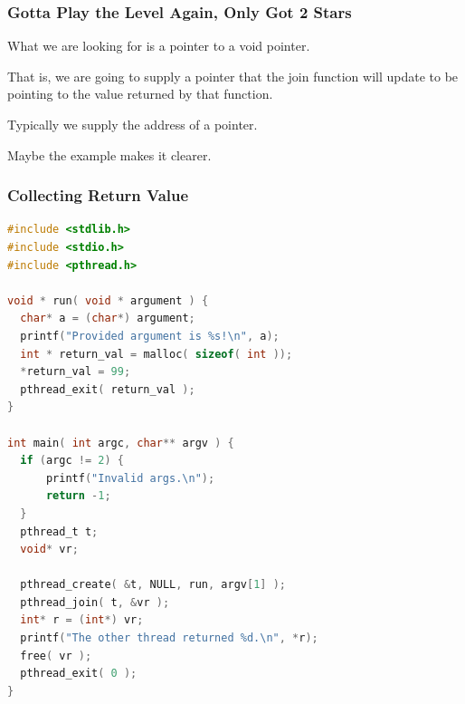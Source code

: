 \begin{frame}
\frametitle{Gotta Play the Level Again, Only Got 2 Stars}

What we are looking for is a pointer to a void pointer. 

That is, we are going to supply a pointer that the join function will update to be pointing to the value returned by that function. 

Typically we supply the address of a pointer.

Maybe the example makes it clearer.
\end{frame}


\begin{frame}[fragile]
\frametitle{Collecting Return Value}

\begin{lstlisting}[language=C]
#include <stdlib.h>
#include <stdio.h>
#include <pthread.h>

void * run( void * argument ) { 
  char* a = (char*) argument;
  printf("Provided argument is %s!\n", a); 
  int * return_val = malloc( sizeof( int )); 
  *return_val = 99; 
  pthread_exit( return_val );
}

int main( int argc, char** argv ) { 
  if (argc != 2) {
      printf("Invalid args.\n");
      return -1; 
  }
  pthread_t t;
  void* vr; 
  
  pthread_create( &t, NULL, run, argv[1] );
  pthread_join( t, &vr );
  int* r = (int*) vr; 
  printf("The other thread returned %d.\n", *r);
  free( vr );
  pthread_exit( 0 );
}
\end{lstlisting}


\end{frame}






